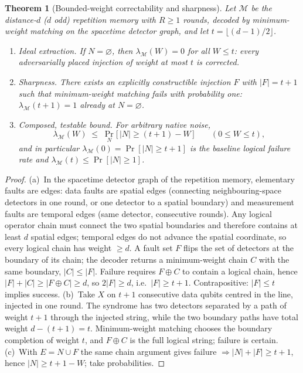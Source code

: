 \documentclass[10pt,twocolumn]{revtex4-2}
\newtheorem{theorem}{Theorem}
\begin{document}
\begin{theorem}[Bounded-weight correctability and sharpness]\label{thm:spacetime}
Let $\mathcal{M}$ be the distance-$d$ ($d$ odd) repetition memory with
$R\ge 1$ rounds, decoded by minimum-weight matching on the spacetime
detector graph, and let $t=\lfloor(d-1)/2\rfloor$.
\begin{enumerate}[label=(\alph*),leftmargin=1.6em]
\item \emph{Ideal extraction.} If $N=\varnothing$, then
$\lambda_{\mathcal{M}}(W)=0$ for all $W\le t$: every adversarially
placed injection of weight at most $t$ is corrected.
\item \emph{Sharpness.} There exists an explicitly constructible
injection $F$ with $|F|=t+1$ such that minimum-weight matching fails
with probability one: $\lambda_{\mathcal{M}}(t+1)=1$ already at
$N=\varnothing$.
\item \emph{Composed, testable bound.} For arbitrary native noise,
\[
\lambda_{\mathcal{M}}(W)\;\le\;\Pr_{N}\!\big[\,|N|\ge (t+1)-W\,\big]
\qquad(0\le W\le t),
\]
and in particular
$\lambda_{\mathcal{M}}(0)=\Pr[|N|\ge t+1]$ is the baseline logical
failure rate and $\lambda_{\mathcal{M}}(t)\le\Pr[|N|\ge 1]$.
\end{enumerate}
\end{theorem}

\begin{proof}
(a)~In the spacetime detector graph of the repetition memory, elementary
faults are edges: data faults are spatial edges (connecting
neighbouring-space detectors in one round, or one detector to a spatial
boundary) and measurement faults are temporal edges (same detector,
consecutive rounds). Any logical operator chain must connect the two
spatial boundaries and therefore contains at least $d$ spatial edges;
temporal edges do not advance the spatial coordinate, so every logical
chain has weight $\ge d$. A fault set $F$ flips the set of detectors at
the boundary of its chain; the decoder returns a minimum-weight chain
$C$ with the same boundary, $|C|\le|F|$. Failure requires $F\oplus C$
to contain a logical chain, hence
$|F|+|C|\ge|F\oplus C|\ge d$, so $2|F|\ge d$, i.e.\
$|F|\ge t+1$. Contrapositive: $|F|\le t$ implies success.
(b)~Take $X$ on $t{+}1$ consecutive data qubits centred in the line,
injected in one round. The syndrome has two detectors separated by a
path of weight $t{+}1$ through the injected string, while the two
boundary paths have total weight $d-(t{+}1)=t$. Minimum-weight matching
chooses the boundary completion of weight $t$, and $F\oplus C$ is the
full logical string; failure is certain. (c)~With $E=N\cup F$ the same
chain argument gives failure $\Rightarrow |N|+|F|\ge t+1$, hence
$|N|\ge t+1-W$; take probabilities.
\end{proof}
\end{document}
